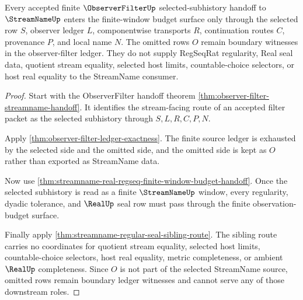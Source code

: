 \begin{theorem}
\label{thm:streamname-observer-filter-finite-window-handoff}
Every accepted finite $\ObserverFilterUp$ selected-subhistory handoff to
$\StreamNameUp$ enters the finite-window budget surface only through the
selected row $S$, observer ledger $L$, componentwise transports $R$, continuation
routes $C$, provenance $P$, and local name $N$. The omitted rows $O$ remain
boundary witnesses in the observer-filter ledger. They do not supply RegSeqRat
regularity, Real seal data, quotient stream equality, selected host limits,
countable-choice selectors, or host real equality to the StreamName consumer.
\end{theorem}
\begin{proof}
Start with the ObserverFilter handoff theorem
\autoref{thm:observer-filter-streamname-handoff}. It identifies the
stream-facing route of an accepted filter packet as the selected subhistory
through $S,L,R,C,P,N$.

Apply \autoref{thm:observer-filter-ledger-exactness}. The finite source ledger
is exhausted by the selected side and the omitted side, and the omitted side is
kept as $O$ rather than exported as StreamName data.

Now use \autoref{thm:streamname-real-regseq-finite-window-budget-handoff}. Once
the selected subhistory is read as a finite $\StreamNameUp$ window, every
regularity, dyadic tolerance, and $\RealUp$ seal row must pass through the
finite observation-budget surface.

Finally apply \autoref{thm:streamname-regular-seal-sibling-route}. The sibling
route carries no coordinates for quotient stream equality, selected host limits,
countable-choice selectors, host real equality, metric completeness, or ambient
$\RealUp$ completeness. Since $O$ is not part of the selected StreamName source,
omitted rows remain boundary ledger witnesses and cannot serve any of those
downstream roles.
\end{proof}
